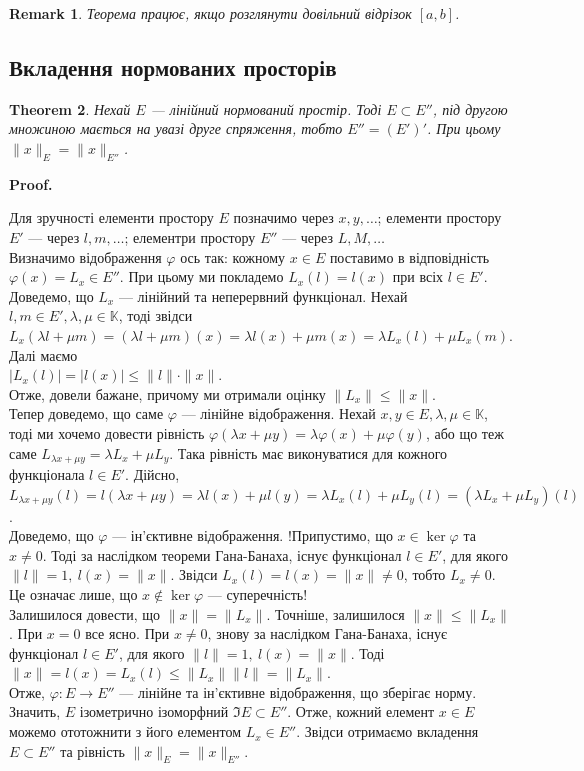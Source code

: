 \documentclass[a4paper, 10pt]{article}
\makeatletter
\theoremstyle{theoremdd}
\newtheorem{theorem}{Theorem}[subsection]
\theoremstyle{theoremdd}
\theoremstyle{theoremdd}
\theoremstyle{theoremdd}
\theoremstyle{theoremdd}
\theoremstyle{theoremdd}
\newtheorem{remark}[theorem]{Remark}
\theoremstyle{theoremdd}
\theoremstyle{theoremdd}
\renewenvironment{proof}[1][Proof.\\]{\par
\pushQED{\hfill \qed}%
\normalfont \topsep6\p@\@plus6\p@\relax
\trivlist
\item\relax
{\bfseries
#1\@addpunct{.}}\hspace\labelsep\ignorespaces
}{%
\popQED\endtrivlist\@endpefalse
}
\makeatother
\begin{document}
\begin{remark}
Теорема працює, якщо розглянути довільний відрізок $[a,b]$.
\end{remark}

\subsection{Вкладення нормованих просторів}
\begin{theorem}
Нехай $E$ --- лінійний нормований простір. Тоді $E \subset E''$, під другою множиною мається на увазі друге спряження, тобто $E'' = (E')'$. При цьому $\|x\|_E = \|x\|_{E''}$.
\end{theorem}

\begin{proof}
Для зручності елементи простору $E$ позначимо через $x,y,\dots$; елементи простору $E'$ --- через $l,m,\dots$; елементри простору $E''$ --- через $L,M,\dots$\\
Визначимо відображення $\varphi$ ось так: кожному $x \in E$ поставимо в відповідність $\varphi(x) = L_x \in E''$. При цьому ми покладемо $L_x(l) = l(x)$ при всіх $l \in E'$. \\
Доведемо, що $L_x$ --- лінійний та неперервний функціонал. Нехай $l,m \in E', \lambda,\mu \in \mathbb{K}$, тоді звідси $L_x(\lambda l + \mu m) = (\lambda l + \mu m)(x) = \lambda l(x) + \mu m(x) = \lambda L_x(l) + \mu L_x(m)$. Далі маємо\\
$|L_x(l)| = |l(x)| \leq \|l\| \cdot \|x\|$.\\
Отже, довели бажане, причому ми отримали оцінку $\|L_x\| \leq \|x\|$.\\
Тепер доведемо, що саме $\varphi$ --- лінійне відображення. Нехай $x,y \in E, \lambda, \mu \in \mathbb{K}$, тоді ми хочемо довести рівність $\varphi(\lambda x + \mu y) = \lambda \varphi(x) + \mu \varphi(y)$, або що теж саме $L_{\lambda x + \mu y} = \lambda L_x + \mu L_y$. Така рівність має виконуватися для кожного функціонала $l \in E'$. Дійсно,\\
$L_{\lambda x + \mu y}(l) = l(\lambda x + \mu y) = \lambda l(x) + \mu l(y) = \lambda L_x(l) + \mu L_y(l) = (\lambda L_x + \mu L_y)(l)$.\\
Доведемо, що $\varphi$ --- ін'єктивне відображення. !Припустимо, що $x \in \ker \varphi$ та $x \neq 0$. Тоді за наслідком теореми Гана-Банаха, існує функціонал $l \in E'$, для якого $\|l\| = 1,\ l(x) = \|x\|$. Звідси $L_x(l) = l(x) = \|x\| \neq 0$, тобто $L_x \neq 0$. Це означає лише, що $x \notin \ker \varphi$ --- суперечність!\\
Залишилося довести, що $\|x\| = \|L_x\|$. Точніше, залишилося $\|x\| \leq \|L_x\|$. При $x = 0$ все ясно. При $x \neq 0$, знову за наслідком Гана-Банаха, існує функціонал $l \in E'$, для якого $\|l\| = 1,\ l(x) = \|x\|$. Тоді\\
$\|x\| = l(x) = L_x(l) \leq \|L_x\| \|l\| = \|L_x\|$.\\
Отже, $\varphi \colon E \to E''$ --- лінійне та ін'єктивне відображення, що зберігає норму. Значить, $E$ ізометрично ізоморфний $\Im E \subset E''$. Отже, кожний елемент $x \in E$ можемо ототожнити з його елементом $L_x \in E''$. Звідси отримаємо вкладення $E \subset E''$ та рівність $\|x\|_E = \|x\|_{E''}$.
\end{proof}
\end{document}
